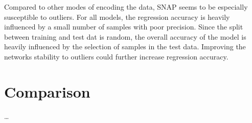 Compared to other modes of encoding the data, SNAP seems to be especially susceptible to outliers.
For all models, the regression accuracy is heavily influenced by a small number of samples with poor precision.
Since the split between training and test dat is random, the overall accuracy of the model is 
heavily influenced by the selection of samples in the test data.
Improving the networks stability to outliers could further increase regression accuracy.


\section{Comparison}
\label{sec:Evaluation:Comparison}

\dots
